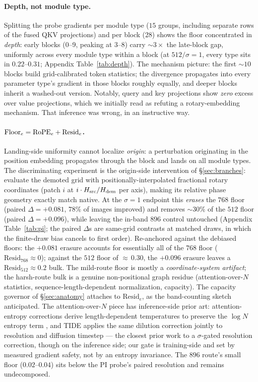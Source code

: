 \paragraph{Depth, not module type.}
Splitting the probe gradients per module type ($15$ groups, including
separate rows of the fused QKV projections) and per block ($28$) shows the
floor concentrated in \emph{depth}: early blocks (0--9, peaking at 3--8)
carry ${\sim}3\times$ the late-block gap, uniformly across every module
type within a block (at $512/\sigma{=}1$, every type sits in
$0.22$--$0.31$; Appendix Table~\ref{tab:depth}). The mechanism
picture: the first ${\sim}10$ blocks build grid-calibrated token
statistics; the divergence propagates into every parameter type's gradient
in those blocks roughly equally, and deeper blocks inherit a washed-out
version. Notably, query and key projections show \emph{zero} excess over
value projections, which we initially read as refuting a
rotary-embedding mechanism. That inference was wrong, in an instructive
way.

\paragraph{$\mathrm{Floor}_e = \mathrm{RoPE}_e + \mathrm{Resid}_e$.}
Landing-side uniformity cannot localize \emph{origin}: a perturbation
originating in the position embedding propagates through the block and
lands on all module types. The discriminating experiment is the
origin-side intervention of \S\ref{sec:branches}: evaluate the demoted
grid with positionally-interpolated fractional rotary coordinates (patch
$i$ at $i \cdot H_{\mathrm{src}}/H_{\mathrm{dem}}$ per axis), making its
relative phase geometry exactly match native. At the $\sigma{=}1$
endpoint this \emph{erases} the $768$ floor (paired
$\Delta = +0.081$, $78\%$ of images improved) and removes ${\sim}30\%$
of the $512$ floor (paired $\Delta = +0.096$), while leaving the in-band
$896$ control untouched (Appendix Table~\ref{tab:pi}; the paired
$\Delta$s are same-grid contrasts at matched draws, in which the
finite-draw bias cancels to first order). Re-anchored against the
debiased floors: the $+0.081$ erasure accounts for essentially all of
the $768$ floor ($\mathrm{Resid}_{768} \approx 0$); against the $512$
floor of ${\approx}\,0.30$, the $+0.096$ erasure leaves a
$\mathrm{Resid}_{512} \approx 0.2$ bulk. The mild-route floor is mostly
a \emph{coordinate-system artifact}; the harsh-route bulk is a genuine
non-positional graph residue (attention-over-$N$ statistics,
sequence-length-dependent normalization, capacity). The capacity
governor of \S\ref{sec:anatomy} attaches to $\mathrm{Resid}_e$, as the
band-counting sketch anticipated. The attention-over-$N$ piece has
inference-side prior art: attention-entropy corrections derive
length-dependent temperatures to preserve the $\log N$ entropy term
\citep{li2025infoscale}, and TIDE applies the same dilution correction
jointly to resolution and diffusion timestep \citep{liu2026tide} ---
the closest prior work to a $\sigma$-gated resolution correction,
though on the inference side; our gate is training-side and set by
measured gradient safety, not by an entropy invariance. The $896$ route's small floor
($0.02$--$0.04$) sits below the PI probe's paired resolution and remains
undecomposed.

